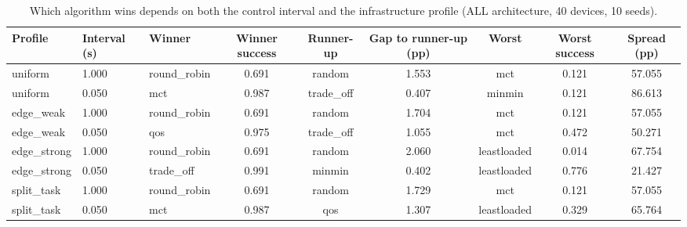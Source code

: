 \begin{table}
\centering
\scriptsize
\caption{Which algorithm wins depends on both the control interval and the infrastructure profile (ALL architecture, 40 devices, 10 seeds).}
\label{tab:p1-hetero-ranking}
\begin{tabular}{lllcccccc}
\toprule
Profile & Interval (s) & Winner & Winner success & Runner-up & Gap to runner-up (pp) & Worst & Worst success & Spread (pp) \\
\midrule
uniform & 1.000 & round\_robin & 0.691 & random & 1.553 & mct & 0.121 & 57.055 \\
uniform & 0.050 & mct & 0.987 & trade\_off & 0.407 & minmin & 0.121 & 86.613 \\
edge\_weak & 1.000 & round\_robin & 0.691 & random & 1.704 & mct & 0.121 & 57.055 \\
edge\_weak & 0.050 & qos & 0.975 & trade\_off & 1.055 & mct & 0.472 & 50.271 \\
edge\_strong & 1.000 & round\_robin & 0.691 & random & 2.060 & leastloaded & 0.014 & 67.754 \\
edge\_strong & 0.050 & trade\_off & 0.991 & minmin & 0.402 & leastloaded & 0.776 & 21.427 \\
split\_task & 1.000 & round\_robin & 0.691 & random & 1.729 & mct & 0.121 & 57.055 \\
split\_task & 0.050 & mct & 0.987 & qos & 1.307 & leastloaded & 0.329 & 65.764 \\
\bottomrule
\end{tabular}
\par\vspace{2pt}{\footnotesize\raggedright Spread is the distance between the best and worst algorithm in the same cell; it measures how much the choice is worth there.\par}
\end{table}
